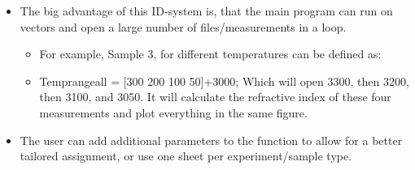 \documentclass[12pt]{article}
\begin{document}
\begin{itemize}
\item	The big advantage of this ID-system is, that the main program can run on vectors and open a large number of files/measurements in a loop. 
\begin{itemize}
	\item 	For example, Sample 3, for different temperatures can be defined as:
\item	Temprangeall = [300 200 100 50]+3000; Which will open 3300, then 3200, then 3100, and 3050. It will calculate the refractive index of these four measurements and plot everything in the same figure. 
\end{itemize} 
\item	The user can add additional parameters to the function to allow for a better tailored assignment, or use one sheet per experiment/sample type. 
\end{itemize}
\end{document}
